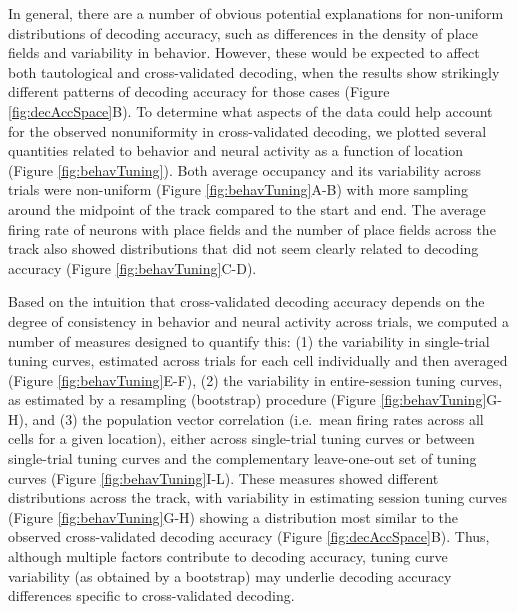\documentclass[11pt]{article}
\begin{document}
{\color{black} In general, there are a number of obvious potential
  explanations for non-uniform distributions of decoding accuracy,
  such as differences in the density of place fields and variability
  in behavior. However, these would be expected to affect both
  tautological and cross-validated decoding, when the results show
  strikingly different patterns of decoding accuracy for those cases
  (Figure \ref{fig:decAccSpace}B). To determine what aspects of the
  data could help account for the observed nonuniformity in
  cross-validated decoding, we plotted several quantities related to
  behavior and neural activity as a function of location (Figure
  \ref{fig:behavTuning}). Both average occupancy and its variability
  across trials were non-uniform (Figure \ref{fig:behavTuning}A-B)
  with more sampling around the midpoint of the track compared to the
  start and end. The average firing rate of neurons with place fields
  and the number of place fields across the track also showed
  distributions that did not seem clearly related to decoding accuracy
  (Figure \ref{fig:behavTuning}C-D).

Based on the intuition that cross-validated decoding accuracy depends
on the degree of consistency in behavior and neural activity across
trials, we computed a number of measures designed to quantify this:
(1) the variability in single-trial tuning curves, estimated across trials
for each cell individually and then averaged (Figure
\ref{fig:behavTuning}E-F), (2) the variability in entire-session
tuning curves, as estimated by a resampling (bootstrap) procedure
(Figure \ref{fig:behavTuning}G-H), and (3) the population vector
correlation (i.e.\ mean firing rates across all cells for a given
location), either across single-trial tuning curves or between
single-trial tuning curves and the complementary leave-one-out set of
tuning curves (Figure \ref{fig:behavTuning}I-L). These measures showed
different distributions across the track, with variability in
estimating session tuning curves (Figure \ref{fig:behavTuning}G-H)
showing a distribution most similar to the observed cross-validated
decoding accuracy (Figure \ref{fig:decAccSpace}B). Thus, although
multiple factors contribute to decoding accuracy, tuning curve
variability (as obtained by a bootstrap) may underlie decoding
accuracy differences specific to cross-validated decoding.}
\end{document}
